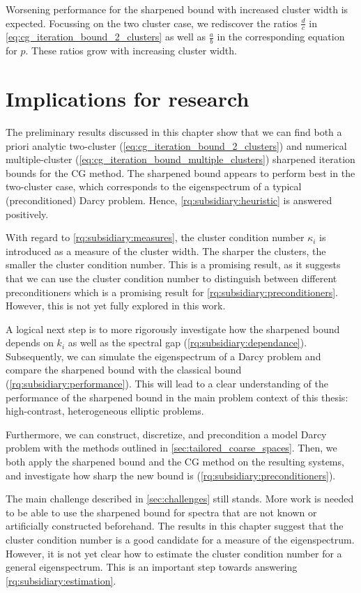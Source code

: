Worsening performance for the sharpened bound with increased cluster width is expected. Focussing on the two cluster case, we rediscover the ratios $\frac{d}{c}$ in \cref{eq:cg_iteration_bound_2_clusters} as well as $\frac{a}{b}$ in the corresponding equation for $p$. These ratios grow with increasing cluster width.

\section{Implications for research}\label{sec:cg_sharpened_convrate_implications}
The preliminary results discussed in this chapter show that we can find both a priori analytic two-cluster (\cref{eq:cg_iteration_bound_2_clusters}) and numerical multiple-cluster (\cref{eq:cg_iteration_bound_multiple_clusters}) sharpened iteration bounds for the CG method. The sharpened bound appears to perform best in the two-cluster case, which corresponds to the eigenspectrum of a typical (preconditioned) Darcy problem. Hence, \ref{rq:subsidiary:heuristic} is answered positively. 

With regard to \ref{rq:subsidiary:measures}, the cluster condition number $\kappa_i$ is introduced as a measure of the cluster width. The sharper the clusters, the smaller the cluster condition number. This is a promising result, as it suggests that we can use the cluster condition number to distinguish between different preconditioners which is a promising result for \ref{rq:subsidiary:preconditioners}. However, this is not yet fully explored in this work.

A logical next step is to more rigorously investigate how the sharpened bound depends on $k_i$ as well as the spectral gap (\ref{rq:subsidiary:dependance}). Subsequently, we can simulate the eigenspectrum of a Darcy problem and compare the sharpened bound with the classical bound (\ref{rq:subsidiary:performance}). This will lead to a clear understanding of the performance of the sharpened bound in the main problem context of this thesis: high-contrast, heterogeneous elliptic problems.

Furthermore, we can construct, discretize, and precondition a model Darcy problem with the methods outlined in \cref{sec:tailored_coarse_spaces}. Then, we both apply the sharpened bound and the CG method on the resulting systems, and investigate how sharp the new bound is (\ref{rq:subsidiary:preconditioners}).

The main challenge described in \cref{sec:challenges} still stands. More work is needed to be able to use the sharpened bound for spectra that are not known or artificially constructed beforehand. The results in this chapter suggest that the cluster condition number is a good candidate for a measure of the eigenspectrum. However, it is not yet clear how to estimate the cluster condition number for a general eigenspectrum. This is an important step towards answering \ref{rq:subsidiary:estimation}.